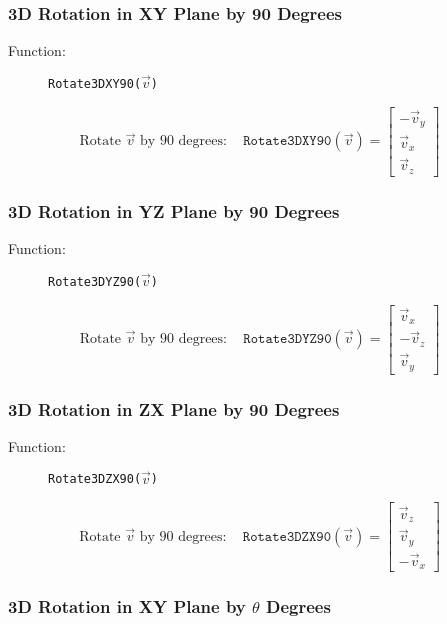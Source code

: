 \documentclass{article}
\begin{document}
\subsubsection{3D Rotation in XY Plane by 90 Degrees}

\begin{description}
\item[Function:] \texttt{Rotate3DXY90(\(\vec{v}\))}
\end{description}

\[
\text{Rotate } \vec{v} \text{ by 90 degrees} : \quad \texttt{Rotate3DXY90}(\vec{v}) = \begin{bmatrix}
-\vec{v}_y \\
\vec{v}_x \\
\vec{v}_z
\end{bmatrix}
\]

\subsubsection{3D Rotation in YZ Plane by 90 Degrees}

\begin{description}
\item[Function:] \texttt{Rotate3DYZ90(\(\vec{v}\))}
\end{description}

\[
\text{Rotate } \vec{v} \text{ by 90 degrees} : \quad \texttt{Rotate3DYZ90}(\vec{v}) = \begin{bmatrix}
\vec{v}_x \\
-\vec{v}_z \\
\vec{v}_y
\end{bmatrix}
\]

\subsubsection{3D Rotation in ZX Plane by 90 Degrees}

\begin{description}
\item[Function:] \texttt{Rotate3DZX90(\(\vec{v}\))}
\end{description}

\[
\text{Rotate } \vec{v} \text{ by 90 degrees} : \quad \texttt{Rotate3DZX90}(\vec{v}) = \begin{bmatrix}
\vec{v}_z \\
\vec{v}_y \\
-\vec{v}_x
\end{bmatrix}
\]

\subsubsection{3D Rotation in XY Plane by \(\theta\) Degrees}
\end{document}
